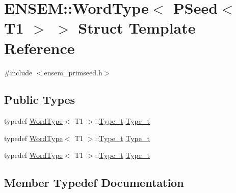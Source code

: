 \hypertarget{structENSEM_1_1WordType_3_01PSeed_3_01T1_01_4_01_4}{}\section{E\+N\+S\+EM\+:\+:Word\+Type$<$ P\+Seed$<$ T1 $>$ $>$ Struct Template Reference}
\label{structENSEM_1_1WordType_3_01PSeed_3_01T1_01_4_01_4}


{\ttfamily \#include $<$ensem\+\_\+primseed.\+h$>$}

\subsection*{Public Types}
\begin{DoxyCompactItemize}
\item 
typedef \mbox{\hyperlink{structENSEM_1_1WordType}{Word\+Type}}$<$ T1 $>$\+::\mbox{\hyperlink{structENSEM_1_1WordType_3_01PSeed_3_01T1_01_4_01_4_a7ec3ab016c8f9b1265ec9fe4ddf9053d}{Type\+\_\+t}} \mbox{\hyperlink{structENSEM_1_1WordType_3_01PSeed_3_01T1_01_4_01_4_a7ec3ab016c8f9b1265ec9fe4ddf9053d}{Type\+\_\+t}}
\item 
typedef \mbox{\hyperlink{structENSEM_1_1WordType}{Word\+Type}}$<$ T1 $>$\+::\mbox{\hyperlink{structENSEM_1_1WordType_3_01PSeed_3_01T1_01_4_01_4_a7ec3ab016c8f9b1265ec9fe4ddf9053d}{Type\+\_\+t}} \mbox{\hyperlink{structENSEM_1_1WordType_3_01PSeed_3_01T1_01_4_01_4_a7ec3ab016c8f9b1265ec9fe4ddf9053d}{Type\+\_\+t}}
\item 
typedef \mbox{\hyperlink{structENSEM_1_1WordType}{Word\+Type}}$<$ T1 $>$\+::\mbox{\hyperlink{structENSEM_1_1WordType_3_01PSeed_3_01T1_01_4_01_4_a7ec3ab016c8f9b1265ec9fe4ddf9053d}{Type\+\_\+t}} \mbox{\hyperlink{structENSEM_1_1WordType_3_01PSeed_3_01T1_01_4_01_4_a7ec3ab016c8f9b1265ec9fe4ddf9053d}{Type\+\_\+t}}
\end{DoxyCompactItemize}


\subsection{Member Typedef Documentation}
\mbox{\label{structENSEM_1_1WordType_3_01PSeed_3_01T1_01_4_01_4_a7ec3ab016c8f9b1265ec9fe4ddf9053d}} 

